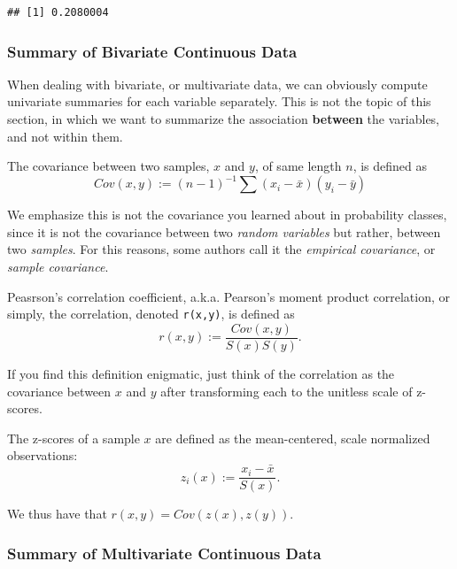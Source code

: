 \documentclass[]{book}
\theoremstyle{definition}
\theoremstyle{definition}
\theoremstyle{definition}
\theoremstyle{remark}
\let\BeginKnitrBlock\begin \let\EndKnitrBlock\end
\begin{document}
\begin{verbatim}
## [1] 0.2080004
\end{verbatim}

\subsubsection{Summary of Bivariate Continuous
Data}\label{summary-of-bivariate-continuous-data}

When dealing with bivariate, or multivariate data, we can obviously
compute univariate summaries for each variable separately. This is not
the topic of this section, in which we want to summarize the association
\textbf{between} the variables, and not within them.

\BeginKnitrBlock{definition}[Covariance]
\protect\hypertarget{def:unnamed-chunk-108}{}{\label{def:unnamed-chunk-108}
{} }The covariance between two samples, \(x\)
and \(y\), of same length \(n\), is defined as
\[Cov(x,y):= (n-1)^{-1} \sum (x_i-\bar x)(y_i-\bar y)  \]
\EndKnitrBlock{definition}

We emphasize this is not the covariance you learned about in probability
classes, since it is not the covariance between two \emph{random
variables} but rather, between two \emph{samples}. For this reasons,
some authors call it the \emph{empirical covariance}, or \emph{sample
covariance}.

\BeginKnitrBlock{definition}[Pearson's Correlation Coefficient]
\protect\hypertarget{def:unnamed-chunk-109}{}{\label{def:unnamed-chunk-109}
{} }Peasrson's
correlation coefficient, a.k.a. Pearson's moment product correlation, or
simply, the correlation, denoted \texttt{r(x,y)}, is defined as
\[r(x,y):=\frac{Cov(x,y)}{S(x)S(y)}. \]
\EndKnitrBlock{definition}

If you find this definition enigmatic, just think of the correlation as
the covariance between \(x\) and \(y\) after transforming each to the
unitless scale of z-scores.

\BeginKnitrBlock{definition}[Z-Score]
\protect\hypertarget{def:unnamed-chunk-110}{}{\label{def:unnamed-chunk-110}
{} }The z-scores of a sample \(x\) are defined as
the mean-centered, scale normalized observations:
\[z_i(x):= \frac{x_i-\bar x}{S(x)}.\]
\EndKnitrBlock{definition}

We thus have that \(r(x,y)=Cov(z(x),z(y))\).

\subsubsection{Summary of Multivariate Continuous
Data}\label{summary-of-multivariate-continuous-data}
\end{document}
